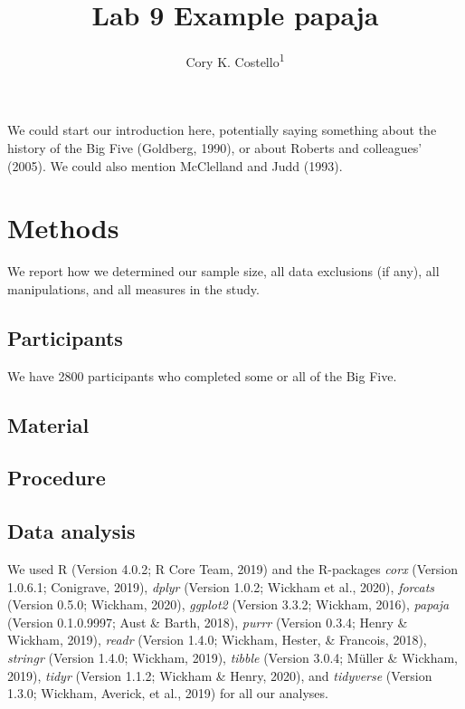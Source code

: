 \documentclass[
  english,
  man,floatsintext]{apa6}
\title{Lab 9 Example papaja}
\author{Cory K. Costello\textsuperscript{1}}
\date{}
\affiliation{\vspace{0.5cm}\textsuperscript{1} University of Oregon}
\begin{document}
\maketitle

We could start our introduction here, potentially saying something about the history of the Big Five (Goldberg, 1990), or about Roberts and colleagues' (2005). We could also mention McClelland and Judd (1993).

\hypertarget{methods}{%
\section{Methods}\label{methods}}

We report how we determined our sample size, all data exclusions (if any), all manipulations, and all measures in the study.

\hypertarget{participants}{%
\subsection{Participants}\label{participants}}

We have 2800 participants who completed some or all of the Big Five.

\hypertarget{material}{%
\subsection{Material}\label{material}}

\hypertarget{procedure}{%
\subsection{Procedure}\label{procedure}}

\hypertarget{data-analysis}{%
\subsection{Data analysis}\label{data-analysis}}

We used R (Version 4.0.2; R Core Team, 2019) and the R-packages \emph{corx} (Version 1.0.6.1; Conigrave, 2019), \emph{dplyr} (Version 1.0.2; Wickham et al., 2020), \emph{forcats} (Version 0.5.0; Wickham, 2020), \emph{ggplot2} (Version 3.3.2; Wickham, 2016), \emph{papaja} (Version 0.1.0.9997; Aust \& Barth, 2018), \emph{purrr} (Version 0.3.4; Henry \& Wickham, 2019), \emph{readr} (Version 1.4.0; Wickham, Hester, \& Francois, 2018), \emph{stringr} (Version 1.4.0; Wickham, 2019), \emph{tibble} (Version 3.0.4; Müller \& Wickham, 2019), \emph{tidyr} (Version 1.1.2; Wickham \& Henry, 2020), and \emph{tidyverse} (Version 1.3.0; Wickham, Averick, et al., 2019) for all our analyses.
\end{document}
